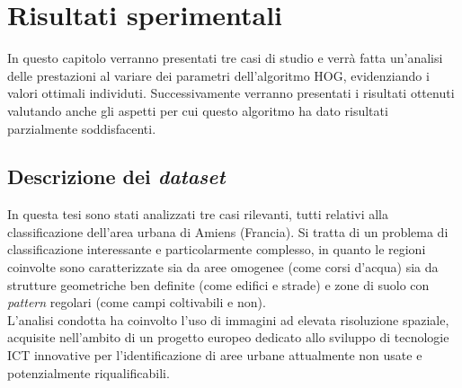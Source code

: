 \chapter{Risultati sperimentali} %

\label{cap:risultati} %


In questo capitolo verranno presentati tre casi di studio e verrà fatta un'analisi delle prestazioni al variare dei parametri dell’algoritmo  HOG, evidenziando i valori ottimali individuti. 
Successivamente verranno presentati i risultati ottenuti valutando anche gli aspetti per cui questo algoritmo ha dato risultati parzialmente soddisfacenti.

\clearpage

\section{Descrizione dei \emph{dataset}}
In questa tesi sono stati analizzati tre casi rilevanti, tutti relativi alla classificazione dell'area urbana di Amiens (Francia).  Si tratta di un problema di classificazione interessante e particolarmente complesso, in quanto le regioni coinvolte sono caratterizzate sia da aree omogenee (come corsi d'acqua) sia da strutture geometriche ben definite (come edifici e strade) e zone di suolo con\emph{ pattern} regolari (come campi coltivabili e non).\\
L'analisi condotta ha coinvolto l'uso di immagini ad elevata risoluzione spaziale, acquisite nell'ambito di un progetto europeo dedicato allo sviluppo di tecnologie ICT innovative per l'identificazione di aree urbane attualmente non usate e potenzialmente riqualificabili.\\

